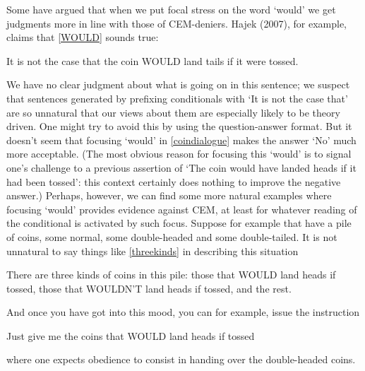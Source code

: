 \documentclass[If.tex]{subfiles}
\begin{document}
Some have argued that when we put focal stress on the word ‘would’ we get judgments more in line with those of CEM-deniers. Hajek (2007), for example, claims that \ref{WOULD} sounds true:
\begin{prop}
\nitem \label{WOULD}
  It is not the case that the coin WOULD land tails if it were tossed.
\end{prop}
We have no clear judgment about what is going on in this sentence; we suspect that sentences generated by prefixing conditionals with ‘It is not the case that’ are so unnatural that our views about them are especially likely to be theory driven. One might try to avoid this by using the question-answer format. But it doesn't seem that focusing ‘would’ in \ref{coindialogue} makes the answer ‘No’ much more acceptable. (The most obvious reason for focusing this ‘would’ is to signal one's challenge to a previous assertion of ‘The coin would have landed heads if it had been tossed’: this context certainly does nothing to improve the negative answer.) Perhaps, however, we can find some more natural examples where focusing ‘would’ provides evidence against CEM, at least for whatever reading of the conditional is activated by such focus. Suppose for example that have a pile of coins, some normal, some double-headed and some double-tailed. It is not unnatural to say things like \ref{threekinds} in describing this situation
\begin{prop}
	\nitem \label{threekinds}
	There are three kinds of coins in this pile: those that WOULD land heads if tossed, those that WOULDN'T land heads if tossed, and the rest.
\end{prop}
And once you have got into this mood, you can for example, issue the instruction
\begin{prop}
\nitem \label{WOULDorder}
	Just give me the coins that WOULD land heads if tossed
\end{prop}
where one expects obedience to consist in handing over the double-headed coins.
\end{document}
